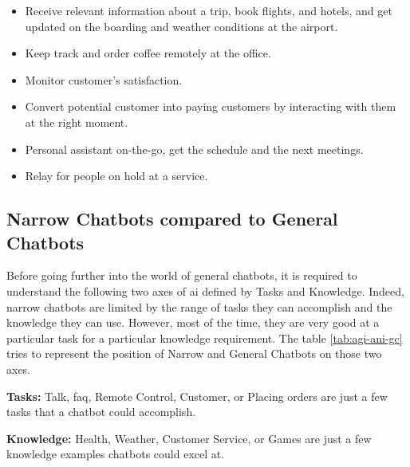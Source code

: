 \begin{itemize}
\setlength\itemsep{0em}
\item Receive relevant information about a trip, book flights, and hotels, and get updated on the boarding and weather conditions at the airport.
\item Keep track and order coffee remotely at the office.
\item Monitor customer's satisfaction.
\item Convert potential customer into paying customers by interacting with them at the right moment.
\item Personal assistant on-the-go, get the schedule and the next meetings.
\item Relay for people on hold at a service.
\end{itemize}


\subsection{Narrow Chatbots compared to General Chatbots}
Before going further into the world of general chatbots, it is required to understand the following two axes of \gls{ai} defined by Tasks and Knowledge.
Indeed, narrow chatbots are limited by the range of tasks they can accomplish and the knowledge they can use. However, most of the time, they are very good at a particular task for a particular knowledge requirement. The table \ref{tab:agi-ani-gc} tries to represent the position of Narrow and General Chatbots on those two axes.

\vspace{1em}
\textbf{Tasks:}
Talk, \gls{faq}, Remote Control, Customer, or Placing orders are just a few tasks that a chatbot could accomplish.

\vspace{1em}
\textbf{Knowledge:}
Health, Weather, Customer Service, or Games are just a few knowledge examples chatbots could excel at.

